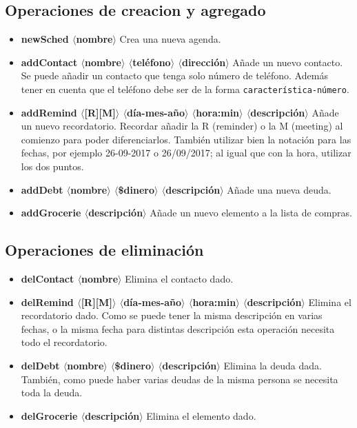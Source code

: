 \documentclass[a4paper,12pt]{article}
\begin{document}
    \subsection*{Operaciones de creacion y agregado}
    \begin{itemize}
      \item \textbf{newSched $\langle$nombre$\rangle$} Crea una nueva agenda.
      
      \item \textbf{addContact $\langle$nombre$\rangle$ $\langle$teléfono$\rangle$ $\langle$dirección$\rangle$}
        Añade un nuevo contacto. Se puede añadir un contacto que tenga solo número de teléfono. Además tener en cuenta que el teléfono 
        debe ser de la forma \texttt{característica-número}.
      
      \item \textbf{addRemind $\langle$[R][M]$\rangle$ $\langle$día-mes-año$\rangle$ $\langle$hora:min$\rangle$ $\langle$descripción$\rangle$}
      Añade un nuevo recordatorio. Recordar añadir la R (reminder) o la M (meeting) al comienzo para poder diferenciarlos.
      También utilizar bien la notación para las fechas, por ejemplo 26-09-2017 o 26/09/2017; al igual que con la hora, utilizar los dos puntos.

      \item \textbf{addDebt $\langle$nombre$\rangle$ $\langle$\$dinero$\rangle$ $\langle$descripción$\rangle$}
      Añade una nueva deuda.

      \item \textbf{addGrocerie $\langle$descripción$\rangle$} Añade un nuevo elemento a la lista de compras.
    \end{itemize}
    \subsection*{Operaciones de eliminación}
    \begin{itemize}  
      \item \textbf{delContact $\langle$nombre$\rangle$} Elimina el contacto dado.
      \item \textbf{delRemind $\langle$[R][M]$\rangle$ $\langle$día-mes-año$\rangle$ $\langle$hora:min$\rangle$ $\langle$descripción$\rangle$} 
      Elimina el recordatorio dado. Como se puede tener la misma descripción en varias fechas, o la misma fecha para distintas descripción esta 
      operación necesita todo el recordatorio.

      \item \textbf{delDebt $\langle$nombre$\rangle$ $\langle$\$dinero$\rangle$ $\langle$descripción$\rangle$} Elimina la deuda dada. También, como puede haber varias deudas de la misma persona se necesita toda la deuda.

      \item \textbf{delGrocerie $\langle$descripción$\rangle$} Elimina el elemento dado.
    \end{itemize}
\end{document}
